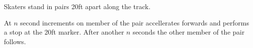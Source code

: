 Skaters stand in pairs 20ft apart along the track.


At $n$ second increments on member of the pair accellerates forwards and performs a stop at the 20ft marker.   
After another $n$ seconds the other member of the pair follows. 
